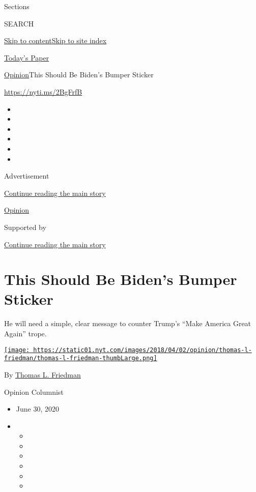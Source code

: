 Sections

SEARCH

\protect\hyperlink{site-content}{Skip to
content}\protect\hyperlink{site-index}{Skip to site index}

\href{https://myaccount.nytimes.com/auth/login?response_type=cookie\&client_id=vi}{}

\href{https://www.nytimes.com/section/todayspaper}{Today's Paper}

\href{/section/opinion}{Opinion}\textbar{}This Should Be Biden's Bumper
Sticker

\href{https://nyti.ms/2BgFrfB}{https://nyti.ms/2BgFrfB}

\begin{itemize}
\item
\item
\item
\item
\item
\item
\end{itemize}

Advertisement

\protect\hyperlink{after-top}{Continue reading the main story}

\href{/section/opinion}{Opinion}

Supported by

\protect\hyperlink{after-sponsor}{Continue reading the main story}

\hypertarget{this-should-be-bidens-bumper-sticker}{%
\section{This Should Be Biden's Bumper
Sticker}\label{this-should-be-bidens-bumper-sticker}}

He will need a simple, clear message to counter Trump's ``Make America
Great Again'' trope.

\href{https://www.nytimes.com/by/thomas-l-friedman}{\texttt{[image: https://static01.nyt.com/images/2018/04/02/opinion/thomas-l-friedman/thomas-l-friedman-thumbLarge.png]}}

By \href{https://www.nytimes.com/by/thomas-l-friedman}{Thomas L.
Friedman}

Opinion Columnist

\begin{itemize}
\item
  June 30, 2020
\item
  \begin{itemize}
  \item
  \item
  \item
  \item
  \item
  \item
  \end{itemize}
\end{itemize}

